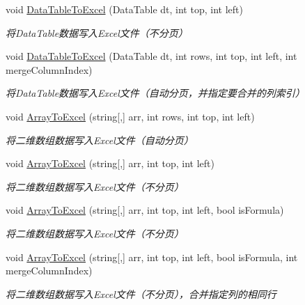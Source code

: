 \begin{DoxyCompactItemize}
void \hyperlink{class_x_c_l_net_tools_1_1_data_handler_1_1_excel_helper_a5a62b1a5ff7569e2236ad5eb7a4efcb8}{Data\-Table\-To\-Excel} (Data\-Table dt, int top, int left)
\begin{DoxyCompactList}\small\item\em 将\-Data\-Table数据写入\-Excel文件（不分页） \end{DoxyCompactList}\item 
void \hyperlink{class_x_c_l_net_tools_1_1_data_handler_1_1_excel_helper_a28b1238b8e1008cb4a39ed189df0b73f}{Data\-Table\-To\-Excel} (Data\-Table dt, int rows, int top, int left, int merge\-Column\-Index)
\begin{DoxyCompactList}\small\item\em 将\-Data\-Table数据写入\-Excel文件（自动分页，并指定要合并的列索引） \end{DoxyCompactList}\item 
void \hyperlink{class_x_c_l_net_tools_1_1_data_handler_1_1_excel_helper_a9f6650dba490907278b2ec278f0ecf5d}{Array\-To\-Excel} (string\mbox{[},\mbox{]} arr, int rows, int top, int left)
\begin{DoxyCompactList}\small\item\em 将二维数组数据写入\-Excel文件（自动分页） \end{DoxyCompactList}\item 
void \hyperlink{class_x_c_l_net_tools_1_1_data_handler_1_1_excel_helper_a5be4d665a31a9347e2fe8b3b58b137af}{Array\-To\-Excel} (string\mbox{[},\mbox{]} arr, int top, int left)
\begin{DoxyCompactList}\small\item\em 将二维数组数据写入\-Excel文件（不分页） \end{DoxyCompactList}\item 
void \hyperlink{class_x_c_l_net_tools_1_1_data_handler_1_1_excel_helper_ad2526a27bf44d46c44d8adb56c868c60}{Array\-To\-Excel} (string\mbox{[},\mbox{]} arr, int top, int left, bool is\-Formula)
\begin{DoxyCompactList}\small\item\em 将二维数组数据写入\-Excel文件（不分页） \end{DoxyCompactList}\item 
void \hyperlink{class_x_c_l_net_tools_1_1_data_handler_1_1_excel_helper_a153dfbee4fd21b4ae6eaa1b75955e849}{Array\-To\-Excel} (string\mbox{[},\mbox{]} arr, int top, int left, bool is\-Formula, int merge\-Column\-Index)
\begin{DoxyCompactList}\small\item\em 将二维数组数据写入\-Excel文件（不分页），合并指定列的相同行 \end{DoxyCompactList}\item 

\end{DoxyCompactItemize}
